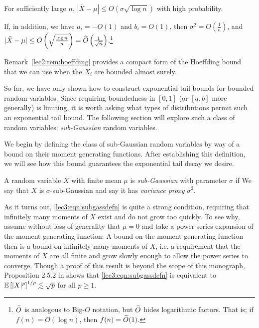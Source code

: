 \begin{remark}
    For sufficiently large $n$, $|\bar{X} - \mu | \leq O(\sigma \sqrt{\log{n}})$ with high probability.
\end{remark}

\begin{remark}\label{lec2:rem:hoeffding}
    If, in addition, we have $a_i = -O(1)$ and $b_i = O(1)$, then $\sigma^2 = O \left( \frac{1}{n}\right)$, and $|\bar{X} - \mu | \leq O\left(\sqrt{\frac{\log n}{n}}\right) = \widetilde{O}\left(\frac{1}{\sqrt{n}}\right)$.\footnote{$\widetilde{O}$ is analogous to Big-$O$ notation, but $\widetilde{O}$ hides logarithmic factors. That is; if $f(n) = O(\log n)$, then $f(n) = \widetilde{O}(1)$.}
\end{remark}

Remark~\ref{lec2:rem:hoeffding} provides a compact form of the Hoeffding bound that we can use when the $X_i$ are bounded almost surely. 

So far, we have only shown how to construct exponential tail bounds for bounded random variables. Since requiring boundedness in $[0, 1]$ (or $[a, b]$ more generally) is limiting, it is worth asking what types of distributions permit such an exponential tail bound. The following section will explore such a class of random variables: \emph{sub-Gaussian} random variables.


We begin by defining the class of sub-Gaussian random variables by way of a bound on their moment generating functions. After establishing this definition, we will see how this bound guarantees the exponential tail decay we desire.

\begin{definition}
    A random variable $X$ with finite mean $\mu$ is \textit{sub-Gaussian} with parameter $\sigma$ if
    We say that $X$ is $\sigma$-sub-Gaussian and say it has \emph{variance proxy} $\sigma^2$.
\end{definition}

\begin{remark}\label{lec3:rem:mgf_strong}
    As it turns out, \eqref{lec3:eqn:subgassdefn} is quite a strong condition, requiring that infinitely many moments of $X$ exist and do not grow too quickly. To see why, assume without loss of generality that $\mu = 0$ and take a power series expansion of the moment generating function:
    A bound on the moment generating function then is a bound on infinitely many moments of $X$, i.e. a requirement that the moments of $X$ are all finite and grow slowly enough to allow the power series to converge. Though a proof of this result is beyond the scope of this monograph, Proposition 2.5.2 in \cite{vershynin2018high} shows that \eqref{lec3:eqn:subgassdefn} is equivalent to $\operatorname*{\mathbb{E}} \left [|X|^p \right ]^{1/p} \lesssim \sqrt{p}$ for all $p \geq 1$.
\end{remark}

